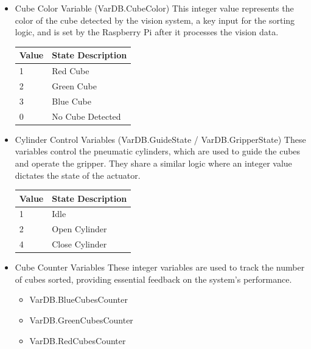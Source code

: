 \begin{itemize}
\item Cube Color Variable (VarDB.CubeColor)
This integer value represents the color of the cube detected by the vision system, a key input for the sorting logic, and is set by the Raspberry Pi after it processes the vision data.
\begin{table}[H]
    \centering
    \begin{tabular}{|p{}|p{}|}
        \hline
        \textbf{Value} & \textbf{State Description} \\
        \hline
        1 & Red Cube \\
        \hline
        2 & Green Cube \\
        \hline
        3 & Blue Cube \\
        \hline
        0 & No Cube Detected \\
        \hline
    \end{tabular}
\end{table}

\item Cylinder Control Variables (VarDB.GuideState / VarDB.GripperState)
These variables control the pneumatic cylinders, which are used to guide the cubes and operate the gripper. They share a similar logic where an integer value dictates the state of the actuator.

   \begin{table}[H]
        \centering
        \begin{tabular}{|p{}|p{}|}
            \hline
            \textbf{Value} & \textbf{State Description} \\
            \hline
            1 & Idle \\
            \hline
            2 & Open Cylinder \\
            \hline
            4 & Close Cylinder \\
            \hline
        \end{tabular}
    \end{table}

\item Cube Counter Variables
These integer variables are used to track the number of cubes sorted, providing essential feedback on the system's performance.
\begin{itemize}
    \item VarDB.BlueCubesCounter
    \item VarDB.GreenCubesCounter
    \item VarDB.RedCubesCounter
\end{itemize}

\end{itemize}

